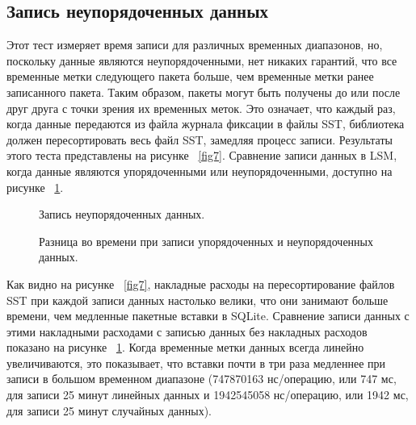 \subsection{Запись неупорядоченных данных}

Этот тест измеряет время записи для различных временных диапазонов, но, поскольку данные являются неупорядоченными, нет никаких гарантий, что все временные метки следующего пакета больше, чем временные метки ранее записанного пакета. Таким образом, пакеты могут быть получены до или после друг друга с точки зрения их временных меток. Это означает, что каждый раз, когда данные передаются из файла журнала фиксации в файлы SST, библиотека должен пересортировать весь файл SST, замедляя процесс записи. Результаты этого теста представлены на рисунке ~\ref{fig7}. Сравнение записи данных в LSM, когда данные являются упорядоченными или неупорядоченными, доступно на рисунке ~\ref {fig8}.

\begin{figure}[!htb]
	\begin{minipage}{0.48\textwidth}
		\centering
		\resizebox{\textwidth}{!}{%
			
		}
		\caption{Запись неупорядоченных данных.}\label{fig7}
	\end{minipage}\hfill
	\begin{minipage}{0.48\textwidth}
		\centering
		\resizebox{\textwidth}{!}{%
			
		}
		\caption{Разница во времени при записи упорядоченных и неупорядоченных данных.}\label{fig8}
	\end{minipage}
\end{figure}

Как видно на рисунке ~\ref {fig7}, накладные расходы на пересортирование файлов SST при каждой записи данных настолько велики, что они занимают больше времени, чем медленные пакетные вставки в SQLite. Сравнение записи данных с этими накладными расходами с записью данных без накладных расходов показано на рисунке ~\ref{fig8}. Когда временные метки данных всегда линейно увеличиваются, это показывает, что вставки почти в три раза медленнее при записи в большом временном диапазоне (747870163 нс/операцию, или 747 мс, для записи 25 минут линейных данных и 1942545058 нс/операцию, или 1942 мс, для записи 25 минут случайных данных).